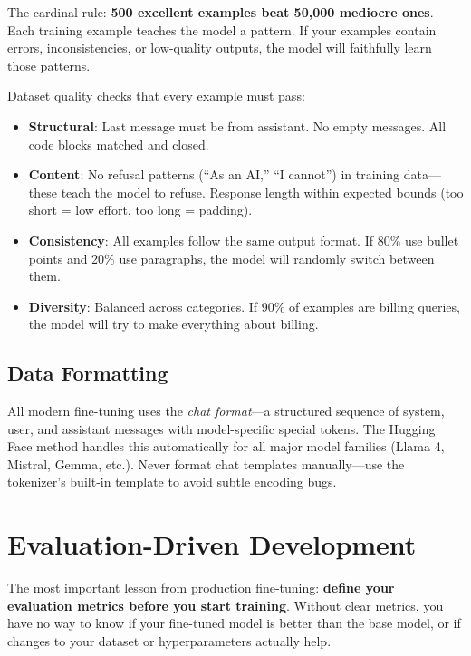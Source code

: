 The cardinal rule: \textbf{500 excellent examples beat 50,000 mediocre ones}. Each training example teaches the model a pattern. If your examples contain errors, inconsistencies, or low-quality outputs, the model will faithfully learn those patterns.

Dataset quality checks that every example must pass:

\begin{itemize}[leftmargin=*]
    \item \textbf{Structural}: Last message must be from assistant. No empty messages. All code blocks matched and closed.
    \item \textbf{Content}: No refusal patterns (``As an AI,'' ``I cannot'') in training data---these teach the model to refuse. Response length within expected bounds (too short = low effort, too long = padding).
    \item \textbf{Consistency}: All examples follow the same output format. If 80\% use bullet points and 20\% use paragraphs, the model will randomly switch between them.
    \item \textbf{Diversity}: Balanced across categories. If 90\% of examples are billing queries, the model will try to make everything about billing.
\end{itemize}

\subsection{Data Formatting}

All modern fine-tuning uses the \emph{chat format}---a structured sequence of system, user, and assistant messages with model-specific special tokens. The Hugging Face  method handles this automatically for all major model families (Llama 4, Mistral, Gemma, etc.). Never format chat templates manually---use the tokenizer's built-in template to avoid subtle encoding bugs.

\section{Evaluation-Driven Development}
\label{sec:eval-driven}

The most important lesson from production fine-tuning: \textbf{define your evaluation metrics before you start training}. Without clear metrics, you have no way to know if your fine-tuned model is better than the base model, or if changes to your dataset or hyperparameters actually help.


